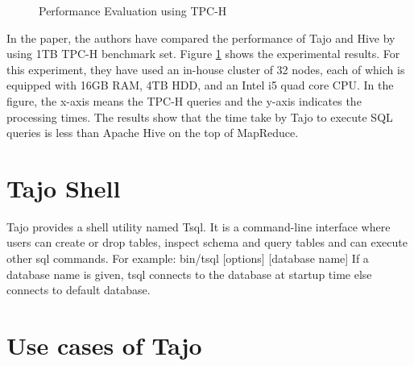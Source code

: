\documentclass[9pt,twocolumn,twoside]{styles/osajnl}
\begin{document}
\begin{figure}[htbp]
\centering
{}
\caption{\cite{tajo-paper} Performance Evaluation using TPC-H}
\label{fig:experiments}
\end{figure}

\noindent
In the \cite{tajo-paper} paper, the authors have compared the performance of
Tajo and Hive by using 1TB TPC-H benchmark set. Figure
\ref{fig:experiments} shows the experimental results. For this
experiment, they have used an in-house cluster of 32 nodes, each of
which is equipped with 16GB RAM, 4TB HDD, and an Intel i5 quad core
CPU. In the figure, the x-axis means the TPC-H queries and the y-axis
indicates the processing times. The results show that the time take by
Tajo to execute SQL queries is less than Apache Hive on the top of
MapReduce.

\section{Tajo Shell}
Tajo provides a shell utility named \cite{www-apache-tajo-tsql}
Tsql. It is a command-line interface where users can create or drop
tables, inspect schema and query tables and can execute other sql
commands.\newline \newline
\noindent
For example: bin/tsql [options] [database name] \newline If a database
name is given, tsql connects to the database at startup time else
connects to default database.

\section{Use cases of Tajo}
\end{document}
